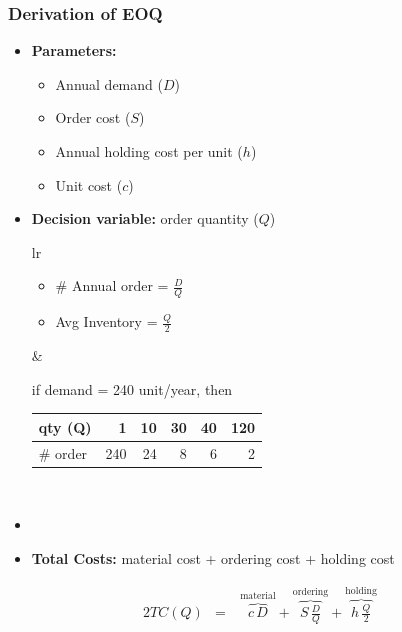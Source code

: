 \documentclass[10pt,handout,notes=show]{beamer}
\begin{document}
\begin{frame}
  \frametitle{Derivation of EOQ }

  \begin{itemize}
    \item \textbf{Parameters:}
    \begin{itemize}
      \item Annual demand ($D$)
      \item Order cost ($S$)
      \item Annual holding cost per unit ($h$)
      \item Unit cost ($c$)
    \end{itemize}
    \item \textbf{Decision variable:} order quantity ($Q$) \hfill {}
    \begin{tabular}{lr}
      \begin{minipage}{0.4\textwidth}
        \begin{itemize}
        \item \# Annual order = $\frac{D}{Q}$
        \item Avg Inventory = $\frac{Q}{2}$
        \end{itemize}
      \end{minipage}
    &
      \begin{minipage}{0.55\textwidth} \footnotesize{
      if demand = 240 unit/year, then \\
      \begin{tabular}{||l|rrrrr||} \hline \hline
        qty (Q)    & 1   & 10  & 30 & 40 & 120 \\ \hline
        \# order    & 240 &  24 &  8 & 6  & 2  \\ \hline \hline
      \end{tabular} }
    \end{minipage}\\
    \end{tabular}
    \item[]
    \item \textbf{Total Costs:} material cost + ordering cost + holding cost
  \end{itemize}
  \begin{alignat*}{2}
    TC(Q)  &=\ & \overbrace{c\, D  }^{\mbox{material}}
            + \overbrace{S\,\frac{D}{Q}  }^{\mbox{ordering}}
            + \overbrace{h\,\frac{Q}{2}  }^{\mbox{holding}}
  \end{alignat*}


\end{frame}
\end{document}
